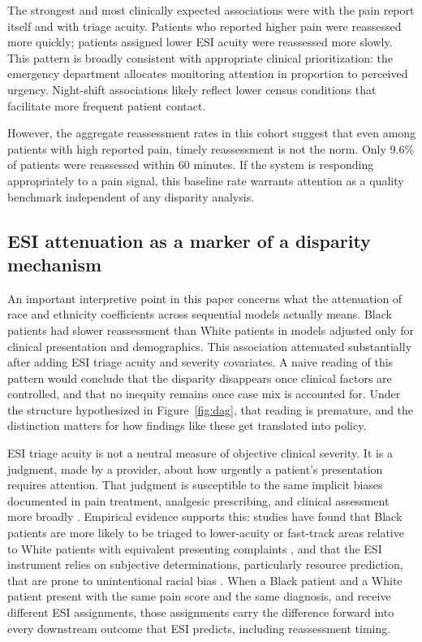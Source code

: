 \documentclass[11pt]{article}
\begin{document}
The strongest and most clinically expected associations were with the pain report itself and with triage acuity.
Patients who reported higher pain were reassessed more quickly; patients assigned lower ESI acuity were reassessed more slowly.
This pattern is broadly consistent with appropriate clinical prioritization: the emergency department allocates monitoring attention in proportion to perceived urgency.
Night-shift associations likely reflect lower census conditions that facilitate more frequent patient contact.

However, the aggregate reassessment rates in this cohort suggest that even among patients with high reported pain, timely reassessment is not the norm.
Only 9.6\% of patients were reassessed within 60 minutes.
If the system is responding appropriately to a pain signal, this baseline rate warrants attention as a quality benchmark independent of any disparity analysis.

\subsection{ESI attenuation as a marker of a disparity mechanism}

An important interpretive point in this paper concerns what the attenuation of race and ethnicity coefficients across sequential models actually means.
Black patients had slower reassessment than White patients in models adjusted only for clinical presentation and demographics.
This association attenuated substantially after adding ESI triage acuity and severity covariates.
A naive reading of this pattern would conclude that the disparity disappears once clinical factors are controlled, and that no inequity remains once case mix is accounted for.
Under the structure hypothesized in Figure~\ref{fig:dag}, that reading is premature, and the distinction matters for how findings like these get translated into policy.

ESI triage acuity is not a neutral measure of objective clinical severity.
It is a judgment, made by a provider, about how urgently a patient's presentation requires attention.
That judgment is susceptible to the same implicit biases documented in pain treatment, analgesic prescribing, and clinical assessment more broadly \citep{Pletcher2008,Anderson2009}.
Empirical evidence supports this: studies have found that Black patients are more likely to be triaged to lower-acuity or fast-track areas relative to White patients with equivalent presenting complaints \citep{Vigil2014,Pines2009}, and that the ESI instrument relies on subjective determinations, particularly resource prediction, that are prone to unintentional racial bias \citep{Fernandes2005}.
When a Black patient and a White patient present with the same pain score and the same diagnosis, and receive different ESI assignments, those assignments carry the difference forward into every downstream outcome that ESI predicts, including reassessment timing.
\end{document}
